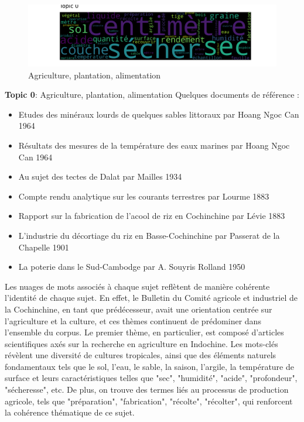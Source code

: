 \begin{figure}[H] %
    \centering
    \includegraphics[width=14cm]{img/final_6_topic 0 .png}
    \caption{Agriculture, plantation, alimentation }
    \label{tp0}
\end{figure}
\textbf{Topic 0}: Agriculture, plantation, alimentation\newline
Quelques documents de référence  : 
\begin{itemize}
    \item 
Etudes des minéraux lourds de quelques sables littoraux par Hoang Ngoc Can 1964
    \item 
Résultats des mesures de la température des eaux marines par Hoang Ngoc Can 1964

    \item 
Au sujet des tectes de Dalat par Mailles 1934
    \item 
Compte rendu analytique sur les courants terrestres par Lourme 1883

    \item 
Rapport sur la fabrication de l'acool de riz en Cochinchine par Lévie 1883

    \item 
L'industrie du décortiage du riz en Basse-Cochinchine par Passerat de la Chapelle 1901

    \item 
La poterie dans le Sud-Cambodge par A. Souyris Rolland 1950
\end{itemize}

Les nuages de mots associés à chaque sujet reflètent de manière cohérente l'identité de chaque sujet. En effet, le Bulletin du Comité agricole et industriel de la Cochinchine, en tant que prédécesseur, avait une orientation centrée sur l'agriculture et la culture, et ces thèmes continuent de prédominer dans l'ensemble du corpus. Le premier thème, en particulier, est composé d'articles scientifiques axés sur la recherche en agriculture en Indochine. Les mots-clés révèlent une diversité de cultures tropicales, ainsi que des éléments naturels fondamentaux tels que le sol, l'eau, le sable, la saison, l'argile, la température de surface et leurs caractéristiques telles que "sec", "humidité", "acide", "profondeur", "sécheresse", etc. De plus, on trouve des termes liés au processus de production agricole, tels que "préparation", "fabrication", "récolte", "récolter", qui renforcent la cohérence thématique de ce sujet.

